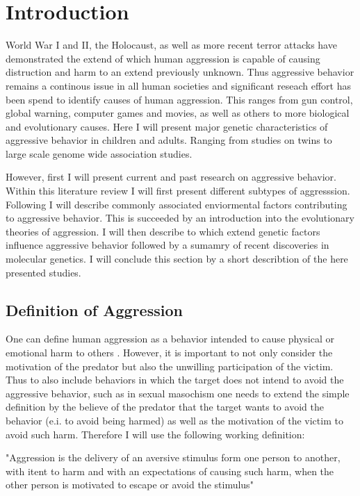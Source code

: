 \chapter{Introduction}
\label{cha:introduction}

World War I and II, the Holocaust, as well as more recent terror attacks have demonstrated the extend of which human aggression is capable of causing distruction and harm to an extend previously unknown. 
Thus aggressive behavior remains a continous issue in all human societies and significant reseach effort has been spend to identify causes of human aggression.
This ranges from gun control, global warning, computer games and movies, as well as others to more biological and evolutionary causes. %
Here I will present major genetic characteristics of aggressive behavior in children and adults.
Ranging from studies on twins to large scale genome wide association studies.

However, first I will present current and past research on aggressive behavior.
Within this literature review I will first present different subtypes of aggresssion.
Following I will describe commonly associated enviormental factors contributing to aggressive behavior.
This is succeeded by an introduction into the evolutionary theories of aggression.
I will then describe to which extend genetic factors influence aggressive behavior followed by a sumamry of recent discoveries in molecular genetics.
I will conclude this section by a short describtion of the here presented studies.

\section{Definition of Aggression}
\label{sec:overview_of_reseach_in_aggression}

One can define human aggression as a behavior intended to cause physical or emotional harm to others \cite{Anderson2002}.
However, it is important to not only consider the motivation of the predator but also the unwilling participation of the victim.
Thus to also include behaviors in which the target does not intend to avoid the aggressive behavior, such as in sexual masochism one needs to extend the simple definition by the believe of the predator that the target wants to avoid the behavior (e.i. to avoid being harmed) \cite{Berkowitz1993,Baumeister1989,Baron2007,Geen2001} as well as the motivation of the victim to avoid such harm.  
Therefore I will use the following working definition:
\begin{mydef}[Aggression]
	\label{def:aggression}
	"Aggression is the delivery of an aversive stimulus form one person to another, with itent to harm and with an expectations of causing such harm, when the other person is motivated to escape or avoid the stimulus" \cite{Geen2001}
\end{mydef}

